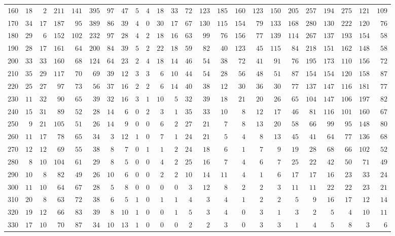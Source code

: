 \begin{sidewaystable}[!tbp]
\begin{center}
\begin{tabular}{lrrrrrrrrrrrrrrrrrrrrrrr}
160&$18$&$ 2$&$211$&$141$&$395$&$ 97$&$47$&$5$&$4$&$18$&$33$&$72$&$123$&$185$&$160$&$123$&$150$&$205$&$257$&$194$&$275$&$121$&$109$\tabularnewline
170&$34$&$17$&$187$&$ 95$&$389$&$ 86$&$39$&$4$&$0$&$30$&$17$&$67$&$130$&$115$&$154$&$ 79$&$133$&$168$&$280$&$130$&$222$&$120$&$ 76$\tabularnewline
180&$29$&$ 6$&$152$&$102$&$232$&$ 97$&$28$&$4$&$2$&$18$&$16$&$63$&$ 99$&$ 76$&$156$&$ 77$&$139$&$114$&$267$&$137$&$193$&$154$&$ 58$\tabularnewline
190&$28$&$17$&$161$&$ 64$&$200$&$ 84$&$39$&$5$&$2$&$22$&$18$&$59$&$ 82$&$ 40$&$123$&$ 45$&$115$&$ 84$&$218$&$151$&$162$&$148$&$ 58$\tabularnewline
200&$33$&$33$&$160$&$ 68$&$124$&$ 64$&$23$&$2$&$4$&$18$&$14$&$46$&$ 54$&$ 38$&$ 72$&$ 41$&$ 91$&$ 76$&$195$&$173$&$110$&$156$&$ 72$\tabularnewline
210&$35$&$29$&$117$&$ 70$&$ 69$&$ 39$&$12$&$3$&$3$&$ 6$&$10$&$44$&$ 54$&$ 28$&$ 56$&$ 48$&$ 51$&$ 87$&$154$&$154$&$120$&$158$&$ 87$\tabularnewline
220&$25$&$27$&$ 97$&$ 73$&$ 56$&$ 37$&$16$&$2$&$2$&$ 6$&$14$&$40$&$ 38$&$ 12$&$ 30$&$ 36$&$ 30$&$ 77$&$137$&$147$&$116$&$181$&$ 77$\tabularnewline
230&$11$&$32$&$ 90$&$ 65$&$ 39$&$ 32$&$16$&$3$&$1$&$10$&$ 5$&$32$&$ 39$&$ 18$&$ 21$&$ 20$&$ 26$&$ 65$&$104$&$147$&$106$&$197$&$ 82$\tabularnewline
240&$15$&$31$&$ 89$&$ 52$&$ 28$&$ 14$&$ 6$&$0$&$2$&$ 3$&$ 1$&$35$&$ 33$&$ 10$&$  8$&$ 12$&$ 17$&$ 46$&$ 81$&$116$&$101$&$160$&$ 67$\tabularnewline
250&$ 9$&$21$&$105$&$ 51$&$ 26$&$ 14$&$ 9$&$0$&$0$&$ 6$&$ 2$&$27$&$ 21$&$  7$&$  8$&$ 13$&$ 20$&$ 58$&$ 66$&$ 99$&$ 95$&$148$&$ 80$\tabularnewline
260&$11$&$17$&$ 78$&$ 65$&$ 34$&$  3$&$12$&$1$&$0$&$ 7$&$ 1$&$24$&$ 21$&$  5$&$  4$&$  8$&$ 13$&$ 45$&$ 41$&$ 64$&$ 77$&$136$&$ 68$\tabularnewline
270&$12$&$12$&$ 69$&$ 55$&$ 38$&$  8$&$ 7$&$0$&$1$&$ 1$&$ 2$&$24$&$ 18$&$  6$&$  1$&$  7$&$  9$&$ 19$&$ 28$&$ 68$&$ 66$&$102$&$ 52$\tabularnewline
280&$ 8$&$10$&$104$&$ 61$&$ 29$&$  8$&$ 5$&$0$&$0$&$ 4$&$ 2$&$25$&$ 16$&$  7$&$  4$&$  6$&$  7$&$ 25$&$ 22$&$ 42$&$ 50$&$ 71$&$ 49$\tabularnewline
290&$10$&$ 8$&$ 82$&$ 49$&$ 26$&$ 10$&$ 6$&$0$&$0$&$ 2$&$ 2$&$10$&$ 14$&$ 11$&$  4$&$  1$&$  6$&$ 17$&$ 17$&$ 16$&$ 23$&$ 33$&$ 24$\tabularnewline
300&$11$&$10$&$ 64$&$ 67$&$ 28$&$  5$&$ 8$&$0$&$0$&$ 0$&$ 0$&$ 3$&$ 12$&$  8$&$  2$&$  2$&$  3$&$ 11$&$ 11$&$ 22$&$ 22$&$ 23$&$ 21$\tabularnewline
310&$20$&$ 8$&$ 63$&$ 72$&$ 38$&$  6$&$ 5$&$1$&$0$&$ 1$&$ 1$&$ 4$&$  3$&$  4$&$  1$&$  2$&$  2$&$  5$&$  9$&$ 16$&$ 17$&$ 12$&$ 14$\tabularnewline
320&$19$&$12$&$ 66$&$ 83$&$ 39$&$  8$&$10$&$1$&$0$&$ 0$&$ 1$&$ 5$&$  3$&$  4$&$  0$&$  3$&$  1$&$  3$&$  2$&$  5$&$  4$&$ 10$&$ 11$\tabularnewline
330&$17$&$10$&$ 70$&$ 87$&$ 34$&$ 10$&$13$&$1$&$0$&$ 0$&$ 0$&$ 2$&$  2$&$  3$&$  0$&$  3$&$  3$&$  1$&$  4$&$  5$&$  8$&$  3$&$  6$\tabularnewline

\end{tabular}
\end{center}
\end{sidewaystable}
